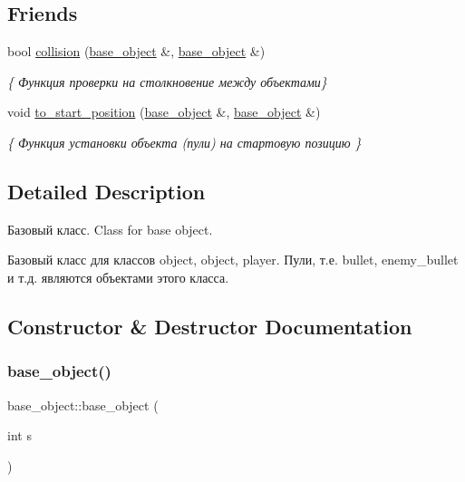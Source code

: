\subsection*{Friends}
\begin{DoxyCompactItemize}
\item 
bool \mbox{\hyperlink{classbase__object_a38cd5b11f00fd31a9939b0c6e293d593}{collision}} (\mbox{\hyperlink{classbase__object}{base\+\_\+object}} \&, \mbox{\hyperlink{classbase__object}{base\+\_\+object}} \&)
\begin{DoxyCompactList}\small\item\em \{ Функция проверки на столкновение между объектами\} \end{DoxyCompactList}\item 
void \mbox{\hyperlink{classbase__object_a712e0cdc0ba13dc26f836adeccdc9264}{to\+\_\+start\+\_\+position}} (\mbox{\hyperlink{classbase__object}{base\+\_\+object}} \&, \mbox{\hyperlink{classbase__object}{base\+\_\+object}} \&)
\begin{DoxyCompactList}\small\item\em \{ Функция установки объекта (пули) на стартовую позицию \} \end{DoxyCompactList}\end{DoxyCompactItemize}


\subsection{Detailed Description}
Базовый класс. Class for base object. 

Базовый класс для классов object, object, player. Пули, т.\+е. bullet, enemy\+\_\+bullet и т.\+д. являются объектами этого класса. 

\subsection{Constructor \& Destructor Documentation}
\mbox{\label{classbase__object_aae443eac7c3fe83ea76ce4006359aaa7}} 
\subsubsection{\texorpdfstring{base\_object()}{base\_object()}}
{\footnotesize\ttfamily base\+\_\+object\+::base\+\_\+object (\begin{DoxyParamCaption}\item[{int}]{s }\end{DoxyParamCaption})}



